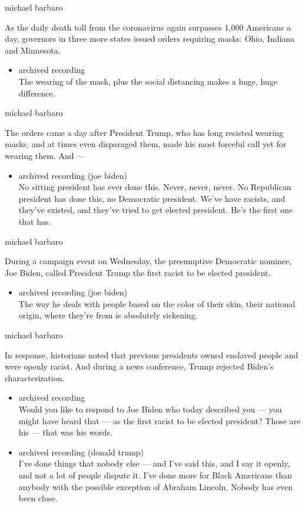 michael barbaro

As the daily death toll from the coronavirus again surpasses 1,000
Americans a day, governors in three more states issued orders requiring
masks: Ohio, Indiana and Minnesota.

\begin{itemize}
\tightlist
\item
  archived recording\\
  The wearing of the mask, plus the social distancing makes a huge, huge
  difference.
\end{itemize}

michael barbaro

The orders came a day after President Trump, who has long resisted
wearing masks, and at times even disparaged them, made his most forceful
call yet for wearing them. And ---

\begin{itemize}
\tightlist
\item
  archived recording (joe biden)\\
  No sitting president has ever done this. Never, never, never. No
  Republican president has done this, no Democratic president. We've
  have racists, and they've existed, and they've tried to get elected
  president. He's the first one that has.
\end{itemize}

michael barbaro

During a campaign event on Wednesday, the presumptive Democratic
nominee, Joe Biden, called President Trump the first racist to be
elected president.

\begin{itemize}
\tightlist
\item
  archived recording (joe biden)\\
  The way he deals with people based on the color of their skin, their
  national origin, where they're from is absolutely sickening.
\end{itemize}

michael barbaro

In response, historians noted that previous presidents owned enslaved
people and were openly racist. And during a news conference, Trump
rejected Biden's characterization.

\begin{itemize}
\item
  archived recording\\
  Would you like to respond to Joe Biden who today described you --- you
  might have heard that --- as the first racist to be elected president?
  Those are his --- that was his words.
\item
  archived recording (donald trump)\\
  I've done things that nobody else --- and I've said this, and I say it
  openly, and not a lot of people dispute it. I've done more for Black
  Americans than anybody with the possible exception of Abraham Lincoln.
  Nobody has even been close.
\end{itemize}

